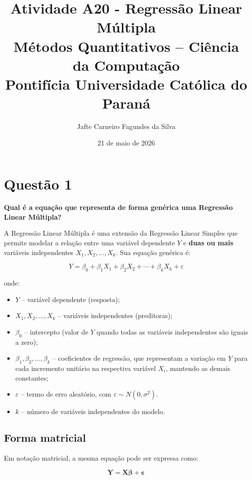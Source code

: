 \documentclass[12pt,a4paper]{article}
\title{%
  \textbf{Atividade A20 - Regressão Linear Múltipla}\\[6pt]
  \large Métodos Quantitativos -- Ciência da Computação\\
  Pontifícia Universidade Católica do Paraná
}
\author{Jafte Carneiro Fagundes da Silva}
\date{21 de maio de 2026}
\begin{document}
\maketitle

\section*{Questão 1}
\textbf{Qual é a equação que representa de forma genérica uma Regressão Linear Múltipla?}

\bigskip

A Regressão Linear Múltipla é uma extensão da Regressão Linear Simples que permite modelar a relação entre uma variável dependente $Y$ e \textbf{duas ou mais} variáveis independentes $X_1, X_2, \ldots, X_k$. Sua equação genérica é:

\begin{equation}
\boxed{Y = \beta_0 + \beta_1 X_1 + \beta_2 X_2 + \cdots + \beta_k X_k + \varepsilon}
\label{eq:rlm}
\end{equation}

\noindent onde:

\begin{itemize}
  \item $Y$ -- variável dependente (resposta);
  \item $X_1, X_2, \ldots, X_k$ -- variáveis independentes (preditoras);
  \item $\beta_0$ -- intercepto (valor de $Y$ quando todas as variáveis independentes são iguais a zero);
  \item $\beta_1, \beta_2, \ldots, \beta_k$ -- coeficientes de regressão, que representam a variação em $Y$ para cada incremento unitário na respectiva variável $X_i$, mantendo as demais constantes;
  \item $\varepsilon$ -- termo de erro aleatório, com $\varepsilon \sim N(0, \sigma^2)$.
  \item $k$ -- número de variáveis independentes do modelo.
\end{itemize}

\subsection*{Forma matricial}

Em notação matricial, a mesma equação pode ser expressa como:

\begin{equation}
\mathbf{Y} = \mathbf{X}\boldsymbol{\beta} + \boldsymbol{\varepsilon}
\end{equation}
\end{document}
